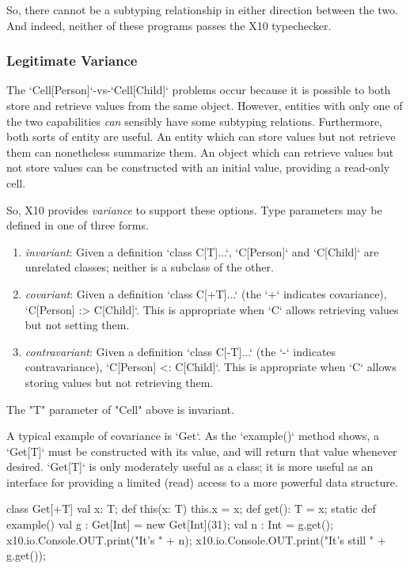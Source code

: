 So, there cannot be a subtyping relationship in either direction between the
two. And indeed, neither of these programs passes the X10 typechecker.


\subsubsection{Legitimate Variance}

The \xcd`Cell[Person]`-vs-\xcd`Cell[Child]` problems occur because it is
possible to both store and retrieve values from the same object. However,
entities with only one of the two capabilities {\em can} sensibly have some
subtyping relations. Furthermore, both sorts of entity are useful. An entity
which can store values but not retrieve them can nonetheless summarize them.
An object which can retrieve values but not store values can be constructed
with an initial value, providing a read-only cell.

So, X10 provides {\em variance} to support these options.  Type parameters
may be defined in one of three forms.  
\begin{enumerate}
\item {\em invariant}: Given a definition \xcd`class C[T]{...}`, \xcd`C[Person]` and
      \xcd`C[Child]` are unrelated classes; neither is a subclass of the
      other.
\item {\em covariant}: Given a definition \xcd`class C[+T]{...}` (the \xcd`+` indicates
      covariance), \xcd`C[Person] :> C[Child]`.  This is appropriate when
      \xcd`C` allows retrieving values but not setting them.
\item {\em contravariant}: Given a definition \xcd`class C[-T]{...}` (the \xcd`-` indicates
      contravariance), \xcd`C[Person] <: C[Child]`.  This is appropriate when
      \xcd`C` allows storing values but not retrieving them.
\end{enumerate}


The \xcd"T" parameter of \xcd"Cell" above is
invariant.  

A typical example of covariance is \xcd`Get`.  As the \xcd`example()` method
shows, a \xcd`Get[T]` must be constructed with its value, and will return that
value whenever desired.  \xcd`Get[T]` is only moderately useful as a class; it
is more useful as an interface for providing a limited (read) access to a more
powerful data structure.
\begin{xten}
class Get[+T] {
  val x: T;
  def this(x: T) { this.x = x; }
  def get(): T = x;
  static def example() {
     val g : Get[Int] = new Get[Int](31);
     val n : Int = g.get();
     x10.io.Console.OUT.print("It's " + n);
     x10.io.Console.OUT.print("It's still " + g.get());
  }
}
\end{xten}

